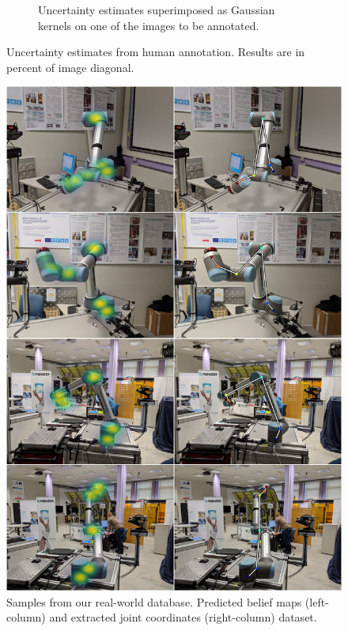\documentclass[conference]{IEEEtran}
\begin{document}
\begin{figure}[!h]
\begin{subfigure}[t]{0.49\columnwidth}
            \caption {
                \label{fig:humanuncertainty_belief} 
                Uncertainty estimates superimposed as Gaussian kernels on one of the images to be annotated.
            }
        \end{subfigure}
        \caption {
            \label{fig:uncertainty} 
            Uncertainty estimates from human annotation. Results are in percent of image diagonal.
        }
    \end{figure}

    \begin{figure}[htbp]
        \centerline{
            \includegraphics[width=0.98\columnwidth]{figures/results/ur10_lab/mosaic.jpg}}
        \caption{
            \label{fig:posresults} Samples from our real-world database. Predicted belief maps (left-column) and extracted joint coordinates (right-column) dataset.
        }
    \end{figure}
\end{document}
